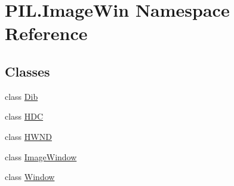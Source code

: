 \hypertarget{namespacePIL_1_1ImageWin}{}\section{P\+I\+L.\+Image\+Win Namespace Reference}
\label{namespacePIL_1_1ImageWin}
\subsection*{Classes}
\begin{DoxyCompactItemize}
\item 
class \hyperlink{classPIL_1_1ImageWin_1_1Dib}{Dib}
\item 
class \hyperlink{classPIL_1_1ImageWin_1_1HDC}{H\+DC}
\item 
class \hyperlink{classPIL_1_1ImageWin_1_1HWND}{H\+W\+ND}
\item 
class \hyperlink{classPIL_1_1ImageWin_1_1ImageWindow}{Image\+Window}
\item 
class \hyperlink{classPIL_1_1ImageWin_1_1Window}{Window}
\end{DoxyCompactItemize}
